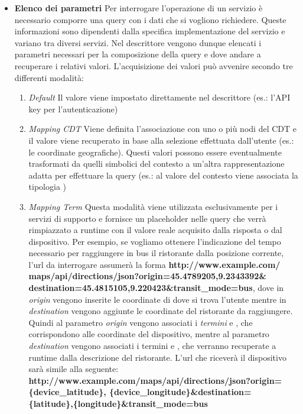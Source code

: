 \begin{itemize}
	\item \textbf{Elenco dei parametri}
	Per interrogare l'operazione di un servizio è necessario comporre una query con i dati che si vogliono richiedere. Queste informazioni sono dipendenti dalla specifica implementazione del servizio e variano tra diversi servizi. Nel descrittore vengono dunque elencati i parametri necessari per la composizione della query e dove andare a recuperare i relativi valori. L'acquisizione dei valori può avvenire secondo tre differenti modalità:
	\begin{enumerate}
		\item \emph{Default}
		Il valore viene impostato direttamente nel descrittore (es.: l'API key per l'autenticazione)
		\item \emph{Mapping CDT}
		Viene definita l'associazione con uno o più nodi del CDT e il valore viene recuperato in base alla selezione effettuata dall'utente (es.: le coordinate geografiche). Questi valori possono essere eventualmente trasformati da quelli simbolici del contesto a un'altra rappresentazione adatta per effettuare la query (es.: al valore  del contesto viene associata la tipologia )
		\item \emph{Mapping Term}
		Questa modalità viene utilizzata esclusivamente per i servizi di supporto e fornisce un placeholder nelle query che verrà rimpiazzato a runtime con il valore reale acquisito dalla risposta o dal dispositivo. Per esempio, se vogliamo ottenere l'indicazione del tempo necessario per raggiungere in bus il ristorante  dalla posizione corrente, l'url da interrogare assumerà la forma \textbf{http://www.example.com/\\maps/api/directions/json?origin=45.4789205,9.2343392\&\\destination=45.4815105,9.220423\&transit\_mode=bus}, dove in \emph{origin} vengono inserite le coordinate di dove si trova l'utente mentre in \emph{destination} vengono aggiunte le coordinate del ristorante da raggiungere. Quindi al parametro \emph{origin} vengono associati i \emph{termini}  e , che corrispondono alle coordinate del dispositivo, mentre al parametro \emph{destination} vengono associati i termini  e , che verranno recuperate a runtime dalla descrizione del ristorante. L'url che riceverà il dispositivo sarà simile alla seguente: \textbf{http://www.example.com/maps/api/directions/json?origin=\\\{device\_latitude\}, \{device\_longitude\}\&destination=\\\{latitude\},\{longitude\}\&transit\_mode=bus}

\end{enumerate}
\end{itemize}
